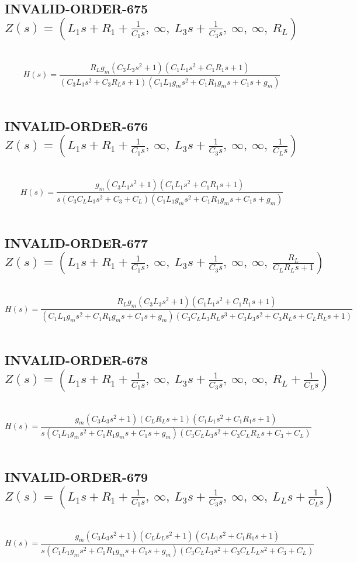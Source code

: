 \documentclass{article}
\begin{document}
\subsection{INVALID-ORDER-675 $Z(s) = \left( L_{1} s + R_{1} + \frac{1}{C_{1} s}, \  \infty, \  L_{3} s + \frac{1}{C_{3} s}, \  \infty, \  \infty, \  R_{L}\right)$ } \ 
\textbf{\[H(s) = \frac{R_{L} g_{m} \left(C_{3} L_{3} s^{2} + 1\right) \left(C_{1} L_{1} s^{2} + C_{1} R_{1} s + 1\right)}{\left(C_{3} L_{3} s^{2} + C_{3} R_{L} s + 1\right) \left(C_{1} L_{1} g_{m} s^{2} + C_{1} R_{1} g_{m} s + C_{1} s + g_{m}\right)}\] } \ 
\subsection{INVALID-ORDER-676 $Z(s) = \left( L_{1} s + R_{1} + \frac{1}{C_{1} s}, \  \infty, \  L_{3} s + \frac{1}{C_{3} s}, \  \infty, \  \infty, \  \frac{1}{C_{L} s}\right)$ } \ 
\textbf{\[H(s) = \frac{g_{m} \left(C_{3} L_{3} s^{2} + 1\right) \left(C_{1} L_{1} s^{2} + C_{1} R_{1} s + 1\right)}{s \left(C_{3} C_{L} L_{3} s^{2} + C_{3} + C_{L}\right) \left(C_{1} L_{1} g_{m} s^{2} + C_{1} R_{1} g_{m} s + C_{1} s + g_{m}\right)}\] } \ 
\subsection{INVALID-ORDER-677 $Z(s) = \left( L_{1} s + R_{1} + \frac{1}{C_{1} s}, \  \infty, \  L_{3} s + \frac{1}{C_{3} s}, \  \infty, \  \infty, \  \frac{R_{L}}{C_{L} R_{L} s + 1}\right)$ } \ 
\textbf{\[H(s) = \frac{R_{L} g_{m} \left(C_{3} L_{3} s^{2} + 1\right) \left(C_{1} L_{1} s^{2} + C_{1} R_{1} s + 1\right)}{\left(C_{1} L_{1} g_{m} s^{2} + C_{1} R_{1} g_{m} s + C_{1} s + g_{m}\right) \left(C_{3} C_{L} L_{3} R_{L} s^{3} + C_{3} L_{3} s^{2} + C_{3} R_{L} s + C_{L} R_{L} s + 1\right)}\] } \ 
\subsection{INVALID-ORDER-678 $Z(s) = \left( L_{1} s + R_{1} + \frac{1}{C_{1} s}, \  \infty, \  L_{3} s + \frac{1}{C_{3} s}, \  \infty, \  \infty, \  R_{L} + \frac{1}{C_{L} s}\right)$ } \ 
\textbf{\[H(s) = \frac{g_{m} \left(C_{3} L_{3} s^{2} + 1\right) \left(C_{L} R_{L} s + 1\right) \left(C_{1} L_{1} s^{2} + C_{1} R_{1} s + 1\right)}{s \left(C_{1} L_{1} g_{m} s^{2} + C_{1} R_{1} g_{m} s + C_{1} s + g_{m}\right) \left(C_{3} C_{L} L_{3} s^{2} + C_{3} C_{L} R_{L} s + C_{3} + C_{L}\right)}\] } \ 
\subsection{INVALID-ORDER-679 $Z(s) = \left( L_{1} s + R_{1} + \frac{1}{C_{1} s}, \  \infty, \  L_{3} s + \frac{1}{C_{3} s}, \  \infty, \  \infty, \  L_{L} s + \frac{1}{C_{L} s}\right)$ } \ 
\textbf{\[H(s) = \frac{g_{m} \left(C_{3} L_{3} s^{2} + 1\right) \left(C_{L} L_{L} s^{2} + 1\right) \left(C_{1} L_{1} s^{2} + C_{1} R_{1} s + 1\right)}{s \left(C_{1} L_{1} g_{m} s^{2} + C_{1} R_{1} g_{m} s + C_{1} s + g_{m}\right) \left(C_{3} C_{L} L_{3} s^{2} + C_{3} C_{L} L_{L} s^{2} + C_{3} + C_{L}\right)}\] } \ 
\end{document}
